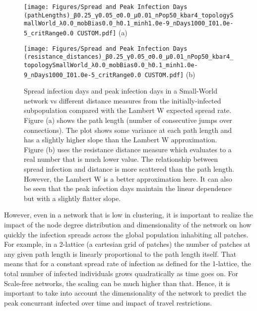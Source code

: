 \begin{figure}[!ht]
	\centering
	\begin{minipage}[b]{0.45\textwidth}
		\texttt{[image: Figures/Spread and Peak Infection Days (pathLengths)\_β0.25\_γ0.05\_σ0.0\_μ0.01\_nPop50\_kbar4\_topologySmallWorld\_λ0.0\_mobBias0.0\_h0.1\_minh1.0e-9\_nDays1000\_I01.0e-5\_critRange0.0 CUSTOM.pdf]}
		\centering
		(a)
	\end{minipage}
	\hfill
	\begin{minipage}[b]{0.45\textwidth}
		\texttt{[image: Figures/Spread and Peak Infection Days (resistance\_distances)\_β0.25\_γ0.05\_σ0.0\_μ0.01\_nPop50\_kbar4\_topologySmallWorld\_λ0.0\_mobBias0.0\_h0.1\_minh1.0e-9\_nDays1000\_I01.0e-5\_critRange0.0 CUSTOM.pdf]}
		\centering
		(b)
	\end{minipage}
	\caption{\small Spread infection days and peak infection days in a Small-World network vs different distance measures from the initially-infected subpopulation compared with the Lambert W expected spread rate. Figure (a) shows the path length (number of consecutive jumps over connections). The plot shows some variance at each path length and has a slightly higher slope than the Lambert W approximation. Figure (b) uses the resistance distance measure which evaluates to a real number that is much lower value. The relationship between spread infection and distance is more scattered than the path length. However, the Lambert W is a better approximation here. It can also be seen that the peak infection days maintain the linear dependence but with a slightly flatter slope. }
	\label{fig: Watts Strogatz spread days path lengths and resistance distances}
\end{figure}

However, even in a network that is low in clustering, it is important to realize the impact of the node degree distribution and dimensionality of the network on how quickly the infection spreads across the global population inhabiting all patches. For example, in a 2-lattice (a cartesian grid of patches) the number of patches at any given path length is linearly proportional to the path length itself. That means that for a constant spread rate of infection as defined for the 1-lattice, the total number of infected individuals grows quadratically as time goes on. For Scale-free networks, the scaling can be much higher than that. Hence, it is important to take into account the dimensionality of the network to predict the peak concurrant infected over time and impact of travel restrictions.

